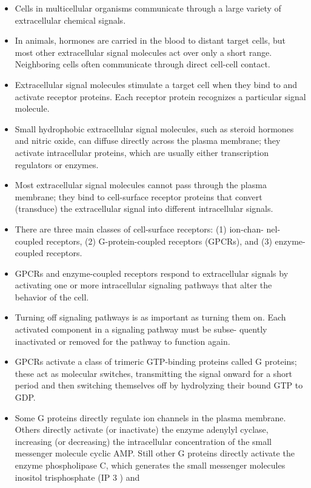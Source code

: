 \begin{itemize}
\item Cells in multicellular organisms communicate through a large variety
of extracellular chemical signals.
\item In animals, hormones are carried in the blood to distant target cells,
but most other extracellular signal molecules act over only a short
range. Neighboring cells often communicate through direct cell-cell
contact.
\item Extracellular signal molecules stimulate a target cell when they bind
to and activate receptor proteins. Each receptor protein recognizes a
particular signal molecule.
\item Small hydrophobic extracellular signal molecules, such as steroid
hormones and nitric oxide, can diffuse directly across the plasma
membrane; they activate intracellular proteins, which are usually
either transcription regulators or enzymes.
\item Most extracellular signal molecules cannot pass through the plasma
membrane; they bind to cell-surface receptor proteins that convert
(transduce) the extracellular signal into different intracellular
signals.
\item There are three main classes of cell-surface receptors: (1) ion-chan-
nel-coupled receptors, (2) G-protein-coupled receptors (GPCRs), and
(3) enzyme-coupled receptors.
\item GPCRs and enzyme-coupled receptors respond to extracellular signals
by activating one or more intracellular signaling pathways that
alter the behavior of the cell.
\item Turning off signaling pathways is as important as turning them on.
Each activated component in a signaling pathway must be subse-
quently inactivated or removed for the pathway to function again.
\item GPCRs activate a class of trimeric GTP-binding proteins called G proteins;
these act as molecular switches, transmitting the signal onward
for a short period and then switching themselves off by hydrolyzing
their bound GTP to GDP.
\item Some G proteins directly regulate ion channels in the plasma membrane.
Others directly activate (or inactivate) the enzyme adenylyl
cyclase, increasing (or decreasing) the intracellular concentration
of the small messenger molecule cyclic AMP. Still other G proteins
directly activate the enzyme phospholipase C, which generates
the small messenger molecules inositol trisphosphate (IP 3 ) and

\end{itemize}
